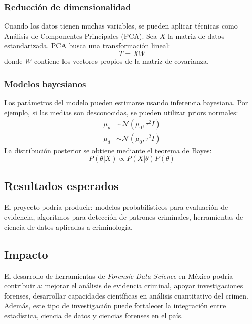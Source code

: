 \documentclass[a4paper,10pt,oneside]{article}
\begin{document}
\subsubsection*{Reducci\'on de dimensionalidad}

Cuando los datos tienen muchas variables, se pueden aplicar t\'ecnicas como An\'alisis de Componentes Principales (PCA). Sea $X$ la matriz de datos estandarizada. PCA busca una transformaci\'on lineal:
\begin{equation}
T = XW
\end{equation}
donde $W$ contiene los vectores propios de la matriz de covarianza.

\subsubsection*{Modelos bayesianos}

Los par\'ametros del modelo pueden estimarse usando inferencia bayesiana. Por ejemplo, si las medias son desconocidas, se pueden utilizar priors normales:
\begin{align}
\mu_p &\sim \mathcal{N}(\mu_0,\tau^2 I) \\
\mu_d &\sim \mathcal{N}(\mu_0,\tau^2 I)
\end{align}
La distribuci\'on posterior se obtiene mediante el teorema de Bayes:
\begin{equation}
P(\theta|X) \propto P(X|\theta)P(\theta)
\end{equation}

\subsection{Resultados esperados}

El proyecto podr\'ia producir: modelos probabil\'isticos para evaluaci\'on de evidencia, algoritmos para detecci\'on de patrones criminales, herramientas de ciencia de datos aplicadas a criminolog\'ia.

\subsection{Impacto}

El desarrollo de herramientas de \textit{Forensic Data Science} en M\'exico podr\'ia contribuir a: mejorar el an\'alisis de evidencia criminal, apoyar investigaciones forenses, desarrollar capacidades cient\'ificas en an\'alisis cuantitativo del crimen. Adem\'as, este tipo de investigaci\'on puede fortalecer la integraci\'on entre estad\'istica, ciencia de datos y ciencias forenses en el pa\'is.
\end{document}
